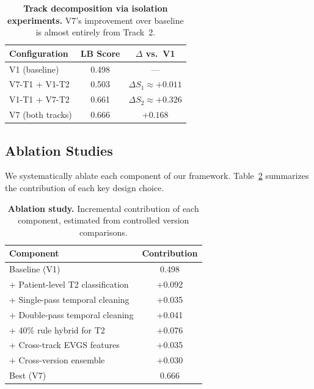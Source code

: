 \begin{table}[t]
    \centering
    \small
    \caption{\textbf{Track decomposition via isolation experiments.} V7's improvement over baseline is almost entirely from Track~2.}
    \label{tab:decomposition}
    \begin{tabular}{lcc}
        \toprule
        Configuration & LB Score & $\Delta$ vs.\ V1 \\
        \midrule
        V1 (baseline) & 0.498 & --- \\
        V7-T1 + V1-T2 & 0.503 & $\Delta S_1 \approx +0.011$ \\
        V1-T1 + V7-T2 & 0.661 & $\Delta S_2 \approx +0.326$ \\
        V7 (both tracks) & 0.666 & $+0.168$ \\
        \bottomrule
    \end{tabular}
\end{table}

\subsection{Ablation Studies}
\label{sec:ablation}

We systematically ablate each component of our framework. Table~\ref{tab:ablation} summarizes the contribution of each key design choice.

\begin{table}[t]
    \centering
    \small
    \caption{\textbf{Ablation study.} Incremental contribution of each component, estimated from controlled version comparisons.}
    \label{tab:ablation}
    \begin{tabular}{lc}
        \toprule
        Component & Contribution \\
        \midrule
        Baseline (V1) & 0.498 \\
        + Patient-level T2 classification & +0.092 \\
        + Single-pass temporal cleaning & +0.035 \\
        + Double-pass temporal cleaning & +0.041 \\
        + 40\% rule hybrid for T2 & +0.076 \\
        + Cross-track EVGS features & +0.035 \\
        + Cross-version ensemble & +0.030 \\
        \midrule
        Best (V7) & 0.666 \\
        \bottomrule
    \end{tabular}
\end{table}


